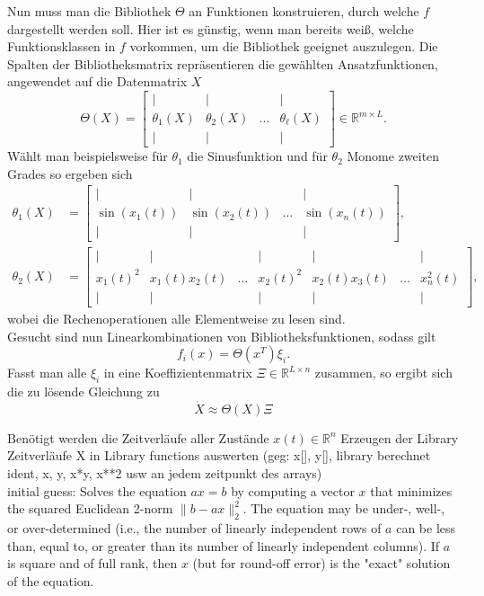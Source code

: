 \documentclass[arbeit=studie,oneside,BCOR=12mm]{ArbeitRST}
\begin{document}
Nun muss man die Bibliothek $\Theta$ an Funktionen konstruieren, durch welche $f$ dargestellt werden soll. Hier ist es günstig, wenn man bereits weiß, welche Funktionsklassen in $f$ vorkommen, um die Bibliothek geeignet auszulegen.
Die Spalten der Bibliotheksmatrix repräsentieren die gewählten Ansatzfunktionen, angewendet auf die Datenmatrix $X$ 
\begin{equation}
\Theta(X) = \begin{bmatrix}
		\mid & \mid & & \mid \\
		\theta_1(X) & \theta_2(X) & \dots & \theta_\ell(X) \\
		\mid & \mid & & \mid 
	\end{bmatrix}\in\mathbb{R}^{m\times L}.
\end{equation} 
Wählt man beispielsweise für $\theta_1$ die Sinusfunktion und für $\theta_2$ Monome zweiten Grades so ergeben sich 
\begin{align}
\theta_1(X) &= \begin{bmatrix}
		\mid 	  & \mid     		  &          & \mid             \\
		\sin(x_1(t)) & \sin(x_2(t))   & \dots    & \sin(x_n(t)) \\
		\mid      & \mid     		  &          & \mid              
	\end{bmatrix},\\
\theta_2(X) &= \begin{bmatrix}
		\mid & \mid & & \mid & \mid & & \mid \\
		x_1(t)^2 & x_1(t)x_2(t) & \dots & x_2(t)^2 & x_2(t)x_3(t) & \dots & x_n^2(t) \\
		\mid & \mid & & \mid & \mid & & \mid
	\end{bmatrix},	
\end{align}
wobei die Rechenoperationen alle Elementweise zu lesen sind. \\
Gesucht sind nun Linearkombinationen von Bibliotheksfunktionen, sodass gilt
\begin{equation}
f_i(x) = \Theta(x^T)\xi_i.
\end{equation}
Fasst man alle $\xi_i$ in eine Koeffizientenmatrix $\Xi\in\mathbb{R}^{L\times n}$ zusammen, so ergibt sich die zu lösende Gleichung zu 
\begin{equation}
\dot{X} \approx \Theta(X)\Xi
\end{equation}



Benötigt werden die Zeitverläufe aller Zustände $x(t)\in\mathbb{R}^n$
Erzeugen der Library\\
Zeitverläufe X in Library functions auswerten (geg: x[], y[], library berechnet ident, x, y, x*y, x**2 usw an jedem zeitpunkt des arrays)\\
initial guess: Solves the equation $a x = b$ by computing a vector $x$ that
    minimizes the squared Euclidean 2-norm $\| b - a x \|^2_2$.
    The equation may be under-, well-, or over-determined (i.e., the
    number of linearly independent rows of $a$ can be less than, equal
    to, or greater than its number of linearly independent columns).
    If $a$ is square and of full rank, then $x$ (but for round-off error)
    is the "exact" solution of the equation.
\end{document}
